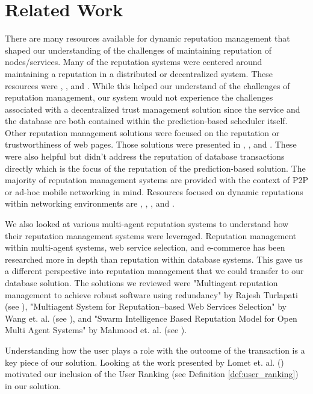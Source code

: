 \section{Related Work}
\label{sec:related_work}

There are many resources available for dynamic reputation management that shaped our understanding of the challenges of maintaining reputation of nodes/services. Many of the reputation systems were centered around maintaining a reputation in a distributed or decentralized system. These resources were \cite{clark_dynamic_2017}, \cite{de_paola_reputation_2008}, and  \cite{hu_reputation_2010}. While this helped our understand of the challenges of reputation management, our system would not experience the challenges associated with a decentralized trust management solution since the service and the database are both contained within the prediction-based scheduler itself. Other reputation management solutions were focused on the reputation or trustworthiness of web pages. Those solutions were presented in \cite{melnikov_towards_2018}, \cite{wang_research_2008}, and \cite{zhang_how_2012}. These were also helpful but didn't address the reputation of database transactions directly which is the focus of the reputation of the prediction-based solution. The majority of reputation management systems are provided with the context of P2P or ad-hoc mobile networking in mind. Resources focused on dynamic reputations within networking environments are \cite{chiejina_dynamic_2014}, \cite{de_paola_reputation_2008}, \cite{hu_reputation_2010}, and  \cite{sun_dynamic_2019}.

We also looked at various multi-agent reputation systems to understand how their reputation management systems were leveraged. Reputation management within multi-agent systems, web service selection, and e-commerce has been researched more in depth than reputation within database systems. This gave us a different perspective into reputation management that we could transfer to our database solution. The solutions we reviewed were "Multiagent reputation management to achieve robust software using redundancy" by Rajesh Turlapati (see \cite{rajesh_turlapati_multiagent_2005}), "Multiagent System for Reputation–based Web Services Selection" by Wang et. al. (see \cite{wang_multiagent_2006}), and "Swarm Intelligence Based Reputation Model for Open Multi Agent Systems" by Mahmood et. al. (see \cite{mahmood_swarm_2006}).

Understanding how the user plays a role with the outcome of the transaction is a key piece of our solution. Looking at the work presented by Lomet et. al. (\cite{lomet2006recovery}) motivated our inclusion of the User Ranking (see Definition \ref{def:user_ranking}) in our solution.

